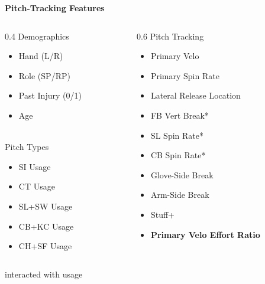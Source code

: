 \documentclass{beamer}
\begin{document}
  \begin{frame}{\bf Pitch-Tracking Features}
    \begin{columns}
      \begin{column}{0.4\linewidth}
        Demographics
        \begin{itemize}
          \item Hand (L/R)
          \item Role (SP/RP)
          \item Past Injury (0/1)
          \item Age
        \end{itemize}
        ~\\
        Pitch Types
        \begin{itemize}
          \item SI Usage
          \item CT Usage
          \item SL+SW Usage
          \item CB+KC Usage
          \item CH+SF Usage
        \end{itemize}
      \end{column}
      \begin{column}{0.6\linewidth}
        Pitch Tracking
        \begin{itemize}
          \item Primary Velo
          \item Primary Spin Rate
          \item Lateral Release Location
          \item FB Vert Break*
          \item SL Spin Rate*
          \item CB Spin Rate*
          \item Glove-Side Break
          \item Arm-Side Break
          \item Stuff+
          \item \alert{\bf Primary Velo Effort Ratio}
        \end{itemize}
      \end{column}
    \end{columns}
    \vfill
    \footnotesize \hfill *interacted with usage
  \end{frame}
\end{document}
